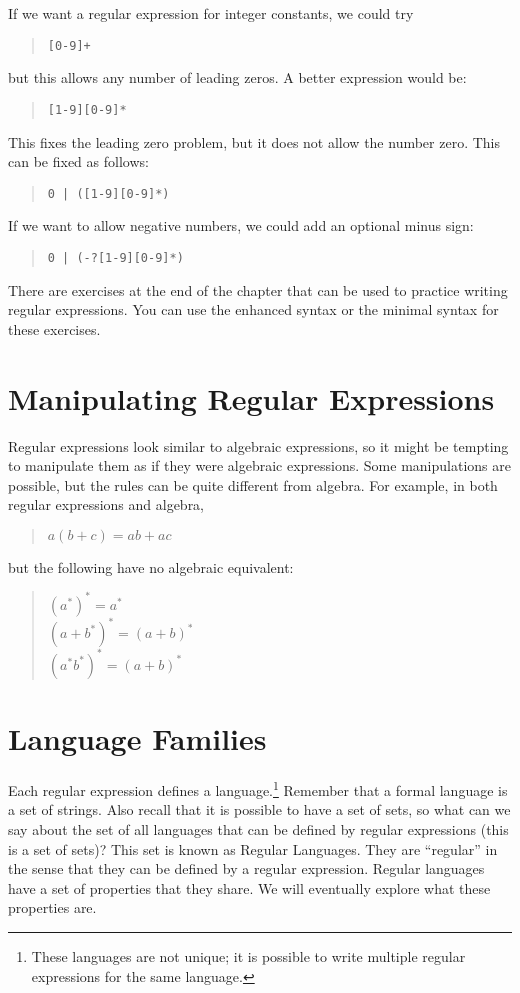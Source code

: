 \documentclass[letterpaper,12pt,openany,reqno]{book}%
\newcommand{\code}[1] {\lstinline[breaklines=yes,breakatwhitespace=yes]{#1}}
\begin{document}
If we want a regular expression for integer constants, we could try
\begin{quote}\code{[0-9]+}\end{quote}
but this allows any number of leading zeros. A better expression would be:
\begin{quote}\code{[1-9][0-9]*}\end{quote}
This fixes the leading zero problem, but it does not allow the number zero. This can be fixed as follows:
\begin{quote}\code{0 | ([1-9][0-9]*)}\end{quote}
If we want to allow negative numbers, we could add an optional minus sign:
\begin{quote}\code{0 | (-?[1-9][0-9]*)}\end{quote}

There are exercises at the end of the chapter that can be used to practice writing regular expressions. You can use the enhanced syntax or the minimal syntax for these exercises.

\section{Manipulating Regular Expressions}

Regular expressions look similar to algebraic expressions, so it might be tempting to manipulate them as if they were algebraic expressions. Some manipulations are possible, but the rules can be quite different from algebra. For example, in both regular expressions and algebra,
\begin{quote}
$a(b+c) = ab + ac$
\end{quote}
but the following have no algebraic equivalent:
\begin{quote}
$(a^*)^* = a^*$\\
$(a+b^*)^* = (a+b)^*$\\
$(a^*b^*)^* = (a+b)^*$
\end{quote}

\section{Language Families}
Each regular expression defines a language.\footnote{These languages are not unique; it is possible to write multiple regular expressions for the same language.} Remember that a formal language is a set of strings. Also recall that it is possible to have a set of sets, so what can we say about the set of all languages that can be defined by regular expressions (this is a set of sets)? This set is known as Regular Languages. They are ``regular'' in the sense that they can be defined by a regular expression. Regular languages have a set of properties that they share. We will eventually explore what these properties are. 
\end{document}
